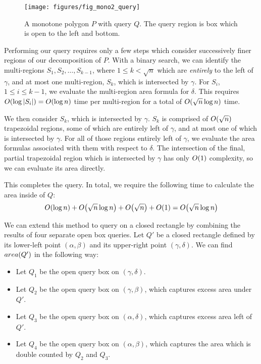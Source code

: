 \begin{figure}[t]
\begin{center}
  \texttt{[image: figures/fig\_mono2\_query]}
  \caption[An alternate query method for a monotone polygon.]{A monotone polygon $P$ with query $Q$. The query region is box which is open to the left and bottom.}
  \label{fig:mono2:query}
\end{center}
\end{figure}

Performing our query requires only a few steps which consider successively finer regions of our decomposition of $P$.
With a binary search, we can identify the multi-regions $S_1, S_2, \ldots, S_{k-1}$, where $1 \leq k < \sqrt{n}$ which are \emph{entirely} to the left of $\gamma$, and at most one multi-region, $S_{k}$, which is intersected by $\gamma$.  
For $S_i$, $1 \leq i \leq k-1$, we evaluate the multi-region area formula for $\delta$. 
This requires $O\!\left(\log{|S_i|}\right) = O\!\left(\log{n}\right)$ time per multi-region for a total of $O\!\left(\sqrt{n}\log{n}\right)$ time.

We then consider $S_k$, which is intersected by $\gamma$.  
$S_k$ is comprised of $O\!\left(\sqrt{n}\right)$ trapezoidal regions, some of which are entirely left of $\gamma$, and at most one of which is intersected by $\gamma$. 
For all of those regions entirely left of $\gamma$, we evaluate the area formulas associated with them with respect to $\delta$. 
The intersection of the final, partial trapezoidal region which is intersected by $\gamma$ has only $O\!\left(1\right)$ complexity, so we can evaluate its area directly.

This completes the query. In total, we require the following time to calculate the area inside of $Q$:
\[ 
O\!\left(\log{n}\right) + O\!\left(\sqrt{n}\log{n}\right) + O\!\left(\sqrt{n}\right) + O\!\left(1\right) = O\!\left(\sqrt{n}\log{n}\right)
\]

We can extend this method to query on a closed rectangle by combining the results of four separate open box queries.
Let $Q'$ be a closed rectangle defined by its lower-left point $(\alpha, \beta)$ and its upper-right point $(\gamma, \delta)$.
We can find $area(Q')$ in the following way:

\begin{itemize}
\item Let $Q_1$ be the open query box on $(\gamma, \delta)$.
\item Let $Q_2$ be the open query box on $(\gamma, \beta)$, which captures excess area under $Q'$.
\item Let $Q_3$ be the open query box on $(\alpha, \delta)$, which captures excess area left of $Q'$.
\item Let $Q_4$ be the open query box on $(\alpha, \beta)$, which captures the area which is double counted by $Q_2$ and $Q_3$.
\end{itemize}

